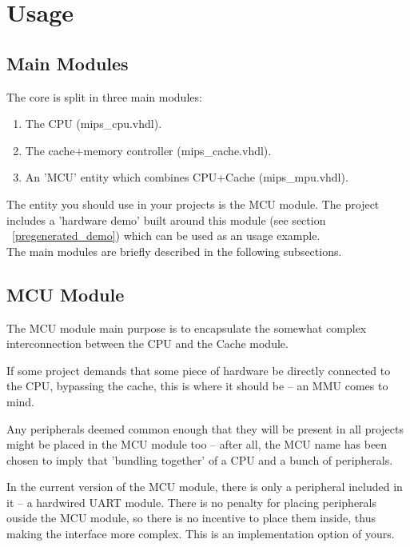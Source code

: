 
\chapter{Usage}

\section{Main Modules}
\label{main_modules}

The core is split in three main modules:

\begin{enumerate}
    \item The CPU (mips\_cpu.vhdl).
    \item The cache+memory controller (mips\_cache.vhdl).
    \item An 'MCU' entity which combines CPU+Cache (mips\_mpu.vhdl).
\end{enumerate}

The entity you should use in your projects is the MCU module. The project 
includes a 'hardware demo' built around this module (see section 
~\ref{pregenerated_demo}) which can be used as an usage example.\\

The main modules are briefly described in the following subsections.


\section{MCU Module}
\label{mcu_module}

The MCU module main purpose is to encapsulate the somewhat complex 
interconnection between the CPU and the Cache module.

If some project demands that some piece of hardware be directly connected to the
CPU, bypassing the cache, this is where it should be -- an MMU comes to mind.

Any peripherals deemed common enough that they will be present in all projects
might be placed in the MCU module too -- after all, the MCU name has been chosen
to imply that 'bundling together' of a CPU and a bunch of peripherals.

In the current version of the MCU module, there is only a peripheral included in 
it -- a hardwired UART module. There is no penalty for placing peripherals 
ouside the MCU module, so there is no incentive to place them inside, thus 
making the interface more complex. This is an implementation option of yours.\\

